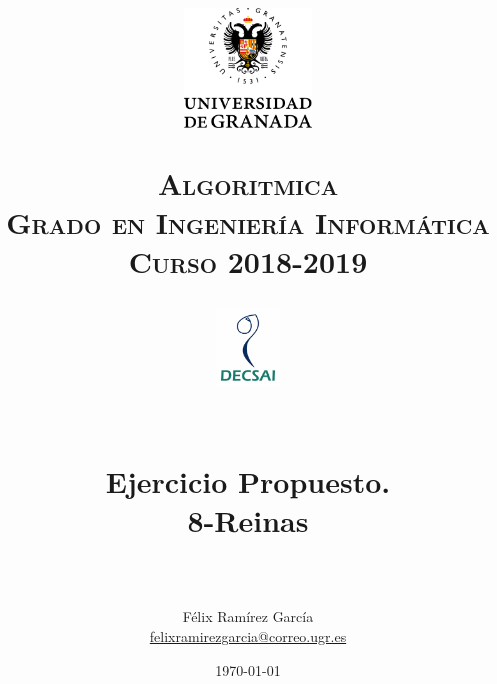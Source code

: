 
\usepackage{url}

\title{	
	\normalfont \normalsize
	\begin{figure}[htb]
		\centering
		\includegraphics[width=0.3\textwidth]{./imagenes/1}
	\end{figure}
	\textsc{\textbf{Algoritmica} \\ Grado en Ingeniería Informática \\ 
	Curso 2018-2019} \\ [25pt] 
	\begin{figure}[htb]
		\centering
		\includegraphics[width=0.15\textwidth]{./imagenes/2}
	\end{figure}
	\horrule{0.5pt} \\[0.4cm]
	\huge Ejercicio Propuesto. \\
	\huge 8-Reinas
	\\ 
	\horrule{2pt} \\[0.5cm] 
}
\author{Félix Ramírez García  \\
\href{mailto:felixramirezgarcia@correo.ugr.es}{felixramirezgarcia@correo.ugr.es}}
\date{\normalsize\today} 



	
	\maketitle %
	
	\newpage %
	
	\tableofcontents %
	
	\listoffigures %
	
